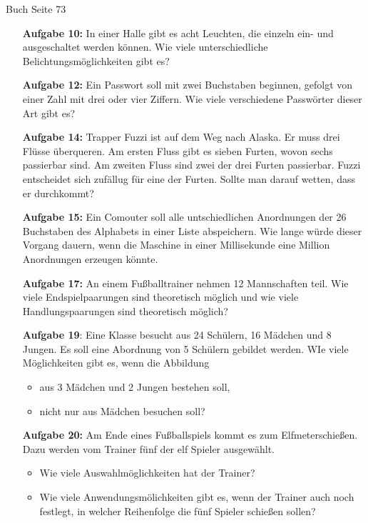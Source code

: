 \documentclass[11pt,a4paper,oneside]{article}
\begin{document}
	\begin{aufgabe}{Buch Seite 73}
		\begin{itemize}[left = 20mm]
			\item [\textbf{Aufgabe 10:}] In einer Halle gibt es acht Leuchten, die einzeln ein- und ausgeschaltet werden können. Wie viele unterschiedliche Belichtungsmöglichkeiten gibt es? 
			\item [\textbf{Aufgabe 12:}] Ein Passwort soll mit zwei Buchstaben beginnen, gefolgt von einer Zahl mit drei oder vier Ziffern. Wie viele verschiedene Passwörter dieser Art gibt es? 
			\item [\textbf{Aufgabe 14:}] Trapper Fuzzi ist auf dem Weg nach Alaska. Er muss drei Flüsse überqueren. Am ersten Fluss gibt es sieben Furten, wovon sechs passierbar sind. Am zweiten Fluss sind zwei der drei Furten passierbar. Fuzzi entscheidet sich zufällug für eine der Furten. Sollte man darauf wetten, dass er durchkommt? 
			\item [\textbf{Aufgabe 15:}] Ein Comouter soll alle untschiedlichen Anordnungen der 26 Buchstaben des Alphabets in einer Liste abspeichern. Wie lange würde dieser Vorgang dauern, wenn die Maschine in einer Millisekunde eine Million Anordnungen erzeugen könnte.  
			\item [\textbf{Aufgabe 17:}] An einem Fußballtrainer nehmen 12 Mannschaften teil. Wie viele Endspielpaarungen sind theoretisch möglich und wie viele Handlungspaarungen sind theoretisch möglich? 
			\item [\textbf{Aufgabe 19}:] Eine Klasse besucht aus 24 Schülern, 16 Mädchen und 8 Jungen. Es soll eine Abordnung von 5 Schülern gebildet werden. WIe viele Möglichkeiten gibt es, wenn die Abbildung 
			\begin{itemize}
				\item aus 3 Mädchen und 2 Jungen bestehen soll, 
				\item nicht nur aus Mädchen besuchen soll? 
			\end{itemize}
			\item [\textbf{Aufgabe 20:}]
			Am Ende eines Fußballspiels kommt es zum Elfmeterschießen. Dazu werden vom Trainer fünf der elf Spieler ausgewählt.
			\begin{itemize}
				\item Wie viele Auswahlmöglichkeiten hat der Trainer? 
				\item Wie viele Anwendungsmölichkeiten gibt es, wenn der Trainer auch noch festlegt, in welcher Reihenfolge die fünf Spieler schießen sollen? 
			\end{itemize}
		\end{itemize}
	\end{aufgabe}
	
\end{document}
